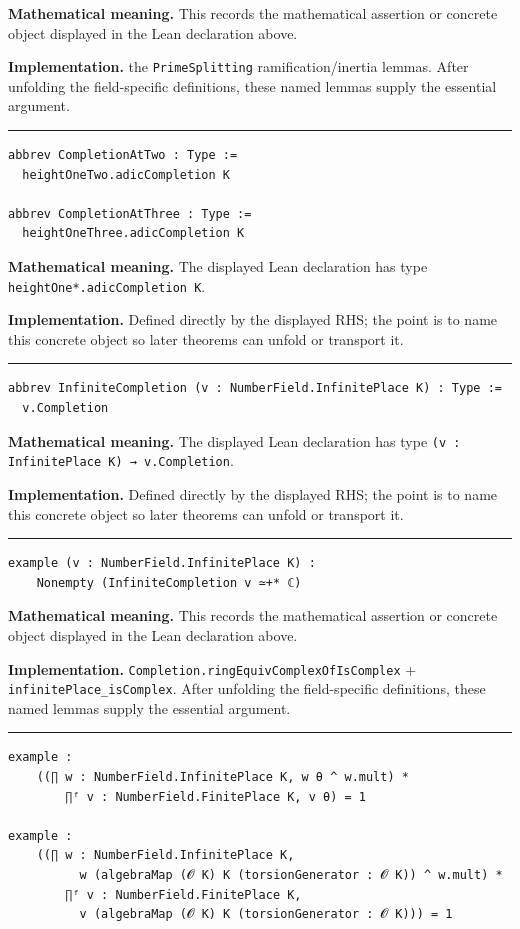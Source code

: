\documentclass[UTF8,a4paper,11pt,fontset=fandol]{ctexart}
\theoremstyle{definition}
\newcommand{\statementsep}{\par\medskip\hrule\medskip}
\begin{document}
\noindent\textbf{Mathematical meaning.} This records the mathematical assertion or concrete object displayed in the Lean declaration above.\par
\noindent\textbf{Implementation.} the \texttt{PrimeSplitting} ramification/inertia lemmas. After unfolding the field-specific definitions, these named lemmas supply the essential argument.\par
\statementsep
\begin{verbatim}
abbrev CompletionAtTwo : Type :=
  heightOneTwo.adicCompletion K

abbrev CompletionAtThree : Type :=
  heightOneThree.adicCompletion K
\end{verbatim}
\noindent\textbf{Mathematical meaning.} The displayed Lean declaration has type \texttt{heightOne*.\allowbreak{}adicCompletion K}.\par
\noindent\textbf{Implementation.} Defined directly by the displayed RHS; the point is to name this concrete object so later theorems can unfold or transport it.\par
\statementsep
\begin{verbatim}
abbrev InfiniteCompletion (v : NumberField.InfinitePlace K) : Type :=
  v.Completion
\end{verbatim}
\noindent\textbf{Mathematical meaning.} The displayed Lean declaration has type \texttt{(v : InfinitePlace K) → v.\allowbreak{}Completion}.\par
\noindent\textbf{Implementation.} Defined directly by the displayed RHS; the point is to name this concrete object so later theorems can unfold or transport it.\par
\statementsep
\begin{verbatim}
example (v : NumberField.InfinitePlace K) :
    Nonempty (InfiniteCompletion v ≃+* ℂ)
\end{verbatim}
\noindent\textbf{Mathematical meaning.} This records the mathematical assertion or concrete object displayed in the Lean declaration above.\par
\noindent\textbf{Implementation.} \texttt{Completion.\allowbreak{}ringEquivComplexOfIsComplex} + \texttt{infinitePlace\_\allowbreak{}isComplex}. After unfolding the field-specific definitions, these named lemmas supply the essential argument.\par
\statementsep
\begin{verbatim}
example :
    ((∏ w : NumberField.InfinitePlace K, w θ ^ w.mult) *
        ∏ᶠ v : NumberField.FinitePlace K, v θ) = 1

example :
    ((∏ w : NumberField.InfinitePlace K,
          w (algebraMap (𝓞 K) K (torsionGenerator : 𝓞 K)) ^ w.mult) *
        ∏ᶠ v : NumberField.FinitePlace K,
          v (algebraMap (𝓞 K) K (torsionGenerator : 𝓞 K))) = 1
\end{verbatim}
\end{document}
